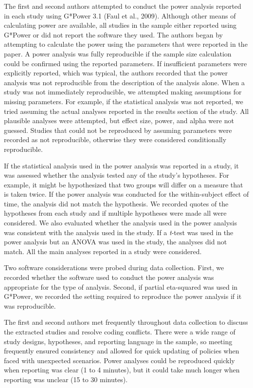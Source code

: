 \documentclass[
  doc, donotrepeattitle,floatsintext]{apa7}
\begin{document}
The first and second authors attempted to conduct the power analysis reported in each study using G*Power 3.1 (Faul et al., 2009). Although other means of calculating power are available, all studies in the sample either reported using G*Power or did not report the software they used. The authors began by attempting to calculate the power using the parameters that were reported in the paper. A power analysis was fully reproducible if the sample size calculation could be confirmed using the reported parameters. If insufficient parameters were explicitly reported, which was typical, the authors recorded that the power analysis was not reproducible from the description of the analysis alone. When a study was not immediately reproducible, we attempted making assumptions for missing parameters. For example, if the statistical analysis was not reported, we tried assuming the actual analyses reported in the results section of the study. All plausible analyses were attempted, but effect size, power, and alpha were not guessed. Studies that could not be reproduced by assuming parameters were recorded as not reproducible, otherwise they were considered conditionally reproducible.

If the statistical analysis used in the power analysis was reported in a study, it was assessed whether the analysis tested any of the study's hypotheses. For example, it might be hypothesized that two groups will differ on a measure that is taken twice. If the power analysis was conducted for the within-subject effect of time, the analysis did not match the hypothesis. We recorded quotes of the hypotheses from each study and if multiple hypotheses were made all were considered. We also evaluated whether the analysis used in the power analysis was consistent with the analysis used in the study. If a \emph{t}-test was used in the power analysis but an ANOVA was used in the study, the analyses did not match. All the main analyses reported in a study were considered.

Two software considerations were probed during data collection. First, we recorded whether the software used to conduct the power analysis was appropriate for the type of analysis. Second, if partial eta-squared was used in G*Power, we recorded the setting required to reproduce the power analysis if it was reproducible.

The first and second authors met frequently throughout data collection to discuss the extracted studies and resolve coding conflicts. There were a wide range of study designs, hypotheses, and reporting language in the sample, so meeting frequently ensured consistency and allowed for quick updating of policies when faced with unexpected scenarios. Power analyses could be reproduced quickly when reporting was clear (1 to 4 minutes), but it could take much longer when reporting was unclear (15 to 30 minutes).
\end{document}

